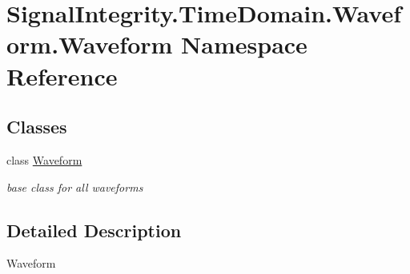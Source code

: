 \hypertarget{namespaceSignalIntegrity_1_1TimeDomain_1_1Waveform_1_1Waveform}{}\section{Signal\+Integrity.\+Time\+Domain.\+Waveform.\+Waveform Namespace Reference}
\label{namespaceSignalIntegrity_1_1TimeDomain_1_1Waveform_1_1Waveform}
\subsection*{Classes}
\begin{DoxyCompactItemize}
\item 
class \hyperlink{classSignalIntegrity_1_1TimeDomain_1_1Waveform_1_1Waveform_1_1Waveform}{Waveform}
\begin{DoxyCompactList}\small\item\em base class for all waveforms \end{DoxyCompactList}\end{DoxyCompactItemize}


\subsection{Detailed Description}
\begin{DoxyVerb}Waveform\end{DoxyVerb}
 